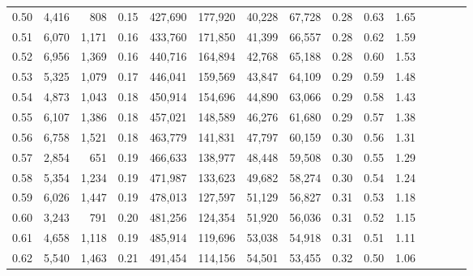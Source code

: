 \begin{tabular}{rrrcrrrrrrrrrrr}
0.50 &   4,416 &     808 &                                       0.15 &  427,690 &  177,920 &   40,228 &   67,728 &  0.28 &  0.63 &                         1.65 \\
0.51 &   6,070 &   1,171 &                                       0.16 &  433,760 &  171,850 &   41,399 &   66,557 &  0.28 &  0.62 &                         1.59 \\
0.52 &   6,956 &   1,369 &                                       0.16 &  440,716 &  164,894 &   42,768 &   65,188 &  0.28 &  0.60 &                         1.53 \\
0.53 &   5,325 &   1,079 &                                       0.17 &  446,041 &  159,569 &   43,847 &   64,109 &  0.29 &  0.59 &                         1.48 \\
0.54 &   4,873 &   1,043 &                                       0.18 &  450,914 &  154,696 &   44,890 &   63,066 &  0.29 &  0.58 &                         1.43 \\
0.55 &   6,107 &   1,386 &                                       0.18 &  457,021 &  148,589 &   46,276 &   61,680 &  0.29 &  0.57 &                         1.38 \\
0.56 &   6,758 &   1,521 &                                       0.18 &  463,779 &  141,831 &   47,797 &   60,159 &  0.30 &  0.56 &                         1.31 \\
0.57 &   2,854 &     651 &                                       0.19 &  466,633 &  138,977 &   48,448 &   59,508 &  0.30 &  0.55 &                         1.29 \\
0.58 &   5,354 &   1,234 &                                       0.19 &  471,987 &  133,623 &   49,682 &   58,274 &  0.30 &  0.54 &                         1.24 \\
0.59 &   6,026 &   1,447 &                                       0.19 &  478,013 &  127,597 &   51,129 &   56,827 &  0.31 &  0.53 &                         1.18 \\
0.60 &   3,243 &     791 &                                       0.20 &  481,256 &  124,354 &   51,920 &   56,036 &  0.31 &  0.52 &                         1.15 \\
0.61 &   4,658 &   1,118 &                                       0.19 &  485,914 &  119,696 &   53,038 &   54,918 &  0.31 &  0.51 &                         1.11 \\
0.62 &   5,540 &   1,463 &                                       0.21 &  491,454 &  114,156 &   54,501 &   53,455 &  0.32 &  0.50 &                         1.06 \\

\end{tabular}
